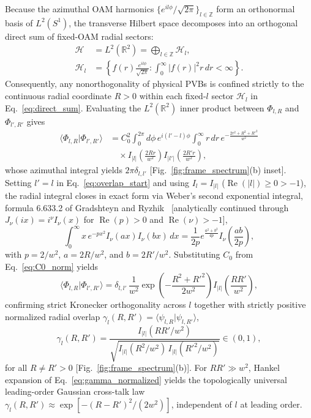 \documentclass[aps,pra,onecolumn,notitlepage,11pt,tightenlines,amsmath,amssymb,floatfix,longbibliography]{revtex4-2}
\providecommand{\braket}[2]{\langle#1\vert#2\rangle}
\providecommand{\abs}[1]{\lvert#1\rvert}
\begin{document}
Because the azimuthal OAM harmonics $\{e^{il\phi}/\sqrt{2\pi}\}_{l\in\mathbb{Z}}$ form an orthonormal basis of $L^2(S^1)$, the transverse Hilbert space decomposes into an orthogonal direct sum of fixed-OAM radial sectors:
\begin{align}
\mathcal{H} &= L^2(\mathbb{R}^2) = \bigoplus_{l\in\mathbb{Z}} \mathcal{H}_l, \nonumber \\
\mathcal{H}_l &= \left\{ f(r)\frac{e^{il\phi}}{\sqrt{2\pi}} : \int_0^\infty \abs{f(r)}^2 r\,dr < \infty \right\}.
\label{eq:direct_sum}
\end{align}
Consequently, any nonorthogonality of physical PVBs is confined strictly to the continuous radial coordinate $R > 0$ within each fixed-$l$ sector $\mathcal{H}_l$ in Eq.~\eqref{eq:direct_sum}. Evaluating the $L^2(\mathbb{R}^2)$ inner product between $\Phi_{l,R}$ and $\Phi_{l',R'}$ gives
\begin{align}
\braket{\Phi_{l,R}}{\Phi_{l',R'}} &= C_0^2 \int_0^{2\pi} d\phi\, e^{i(l'-l)\phi} \int_0^\infty r\,dr\, e^{-\frac{2r^2+R^2+R'^2}{w^2}} \nonumber \\
&\quad \times I_{\abs{l}}\!\left(\frac{2Rr}{w^2}\right) I_{\abs{l'}}\!\left(\frac{2R'r}{w^2}\right),
\label{eq:overlap_start}
\end{align}
whose azimuthal integral yields $2\pi\delta_{l,l'}$ [Fig.~\ref{fig:frame_spectrum}(b) inset]. Setting $l' = l$ in Eq.~\eqref{eq:overlap_start} and using $I_l = I_{\abs{l}}$ ($\operatorname{Re}(\abs{l}) \ge 0 > -1$), the radial integral closes in exact form via Weber's second exponential integral, formula 6.633.2 of Gradshteyn and Ryzhik~\cite{Gradshteyn2014} [analytically continued through $J_\nu(ix) = i^\nu I_\nu(x)$ for $\operatorname{Re}(p) > 0$ and $\operatorname{Re}(\nu) > -1$],
\begin{equation}
\int_0^\infty x\, e^{-px^2} I_\nu(ax) I_\nu(bx)\,dx = \frac{1}{2p} e^{\frac{a^2+b^2}{4p}} I_\nu\!\left(\frac{ab}{2p}\right),
\label{eq:weber_identity}
\end{equation}
with $p = 2/w^2$, $a = 2R/w^2$, and $b = 2R'/w^2$. Substituting $C_0$ from Eq.~\eqref{eq:C0_norm} yields
\begin{equation}
\braket{\Phi_{l,R}}{\Phi_{l',R'}} = \delta_{l,l'}\,\frac{1}{w^2}\exp\!\left(-\frac{R^2 + R'^2}{2w^2}\right) I_{\abs{l}}\!\left(\frac{RR'}{w^2}\right),
\label{eq:overlap_closed}
\end{equation}
confirming strict Kronecker orthogonality across $l$ together with strictly positive normalized radial overlap $\gamma_l(R,R') = \braket{\psi_{l,R}}{\psi_{l,R'}}$,
\begin{equation}
\gamma_l(R,R') = \frac{I_{\abs{l}}(RR'/w^2)}{\sqrt{I_{\abs{l}}(R^2/w^2)\,I_{\abs{l}}(R'^2/w^2)}} \in (0,1),
\label{eq:gamma_normalized}
\end{equation}
for all $R \neq R' > 0$ [Fig.~\ref{fig:frame_spectrum}(b)]. For $RR' \gg w^2$, Hankel expansion of Eq.~\eqref{eq:gamma_normalized} yields the topologically universal leading-order Gaussian cross-talk law $\gamma_l(R,R') \approx \exp[-(R-R')^2/(2w^2)]$, independent of $l$ at leading order.
\end{document}
